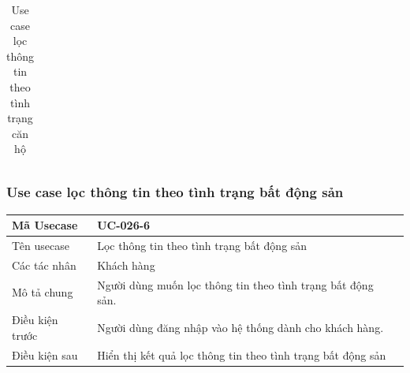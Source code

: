 \documentclass[12pt,a4paper]{article}
\begin{document}
\begin{table}[H]
\begin{tabular}{|p{3.5cm}|p{11.5cm}|c|}
            \\ \hline
        \end{tabular}
        \caption{Use case lọc thông tin theo tình trạng căn hộ}

    \end{table}



    \subsubsection*{Use case lọc thông tin theo tình trạng bất động sản}
    \begin{table}[H]
        \centering
        \begin{tabular}{|p{3.5cm}|p{11.5cm}|c|}
            \hline
            Mã Usecase      & UC-026-6                                                    \\
            \hline
            Tên usecase     & Lọc thông tin theo tình trạng bất động sản                  \\
            \hline
            Các tác nhân    & Khách hàng                                                  \\
            \hline
            Mô tả chung     & Người dùng muốn lọc thông tin theo tình trạng bất động sản. \\
            \hline

            Điều kiện trước & Người dùng đăng nhập vào hệ thống dành cho khách hàng.      \\
            \hline

            Điều kiện sau   & Hiển thị kết quả lọc thông tin theo tình trạng bất động sản \\
            \hline


\end{tabular}
\end{table}
\end{document}
